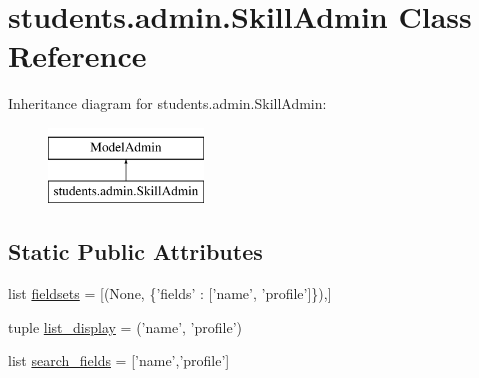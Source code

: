 \hypertarget{classstudents_1_1admin_1_1_skill_admin}{\section{students.\-admin.\-Skill\-Admin Class Reference}
\label{classstudents_1_1admin_1_1_skill_admin}
}
Inheritance diagram for students.\-admin.\-Skill\-Admin\-:\begin{figure}[H]
\begin{center}
\leavevmode
\includegraphics[height=2.000000cm]{classstudents_1_1admin_1_1_skill_admin}
\end{center}
\end{figure}
\subsection*{Static Public Attributes}
\begin{DoxyCompactItemize}
\item 
list \hyperlink{classstudents_1_1admin_1_1_skill_admin_a454e45e7078bd30e268d1e0c89a38575}{fieldsets} = \mbox{[}(None, \{'fields' \-: \mbox{[}'name', 'profile'\mbox{]}\}),\mbox{]}
\item 
tuple \hyperlink{classstudents_1_1admin_1_1_skill_admin_a91d65295b3213f8a1eec76ae8b9f43f7}{list\-\_\-display} = ('name', 'profile')
\item 
list \hyperlink{classstudents_1_1admin_1_1_skill_admin_a4ed1cf2d0e90b6f04b2cd387906b1952}{search\-\_\-fields} = \mbox{[}'name','profile'\mbox{]}
\end{DoxyCompactItemize}


